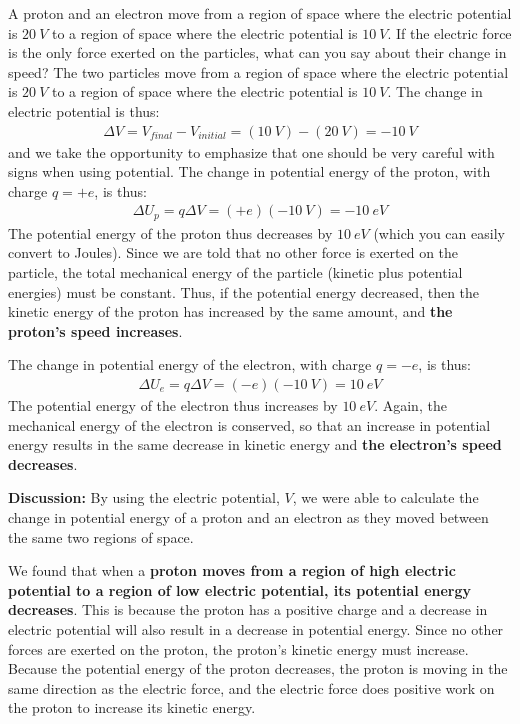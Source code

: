 \begin{example}{A proton and an electron move from a region of space where the electric potential is $\SI{20}{V}$ to a region of space where the electric potential is $\SI{10}{V}$. If the electric force is the only force exerted on the particles, what can you say about their change in speed?}
The two particles move from a region of space where the electric potential is $\SI{20}{V}$ to a region of space where the electric potential is $\SI{10}{V}$. The change in electric potential is thus:
\begin{align*}
\Delta V = V_{final}-V_{initial}=(\SI{10}{V})-(\SI{20}{V})=\SI{-10}{V}
\end{align*}
and we take the opportunity to emphasize that one should be very careful with signs when using potential. The change in potential energy of the proton, with charge $q=+e$, is thus:
\begin{align*}
\Delta U_p=q\Delta V = (+e)(\SI{-10}{V})=\SI{-10}{eV}
\end{align*}
The potential energy of the proton thus decreases by $\SI{10}{eV}$ (which you can easily convert to Joules). Since we are told that no other force is exerted on the particle, the total mechanical energy of the particle (kinetic plus potential energies) must be constant. Thus, if the potential energy decreased, then the kinetic energy of the proton has increased by the same amount, and \textbf{the proton's speed increases}. 

The change in potential energy of the electron, with charge $q=-e$, is thus:
\begin{align*}
\Delta U_e=q\Delta V = (-e)(\SI{-10}{V}) = \SI{10}{eV}
\end{align*}
The potential energy of the electron thus increases by $\SI{10}{eV}$. Again, the mechanical energy of the electron is conserved, so that an increase in potential energy results in the same decrease in kinetic energy and \textbf{the electron's speed decreases}.

\textbf{Discussion: }By using the electric potential, $V$, we were able to calculate the change in potential energy of a proton and an electron as they moved between the same two regions of space.

We found that when a \textbf{proton moves from a region of high electric potential to a region of low electric potential, its potential energy decreases}. This is because the proton has a positive charge and a decrease in electric potential will also result in a decrease in potential energy. Since no other forces are exerted on the proton, the proton's kinetic energy must increase. Because the potential energy of the proton decreases, the proton is moving in the same direction as the electric force, and the electric force does positive work on the proton to increase its kinetic energy.


\end{example}
